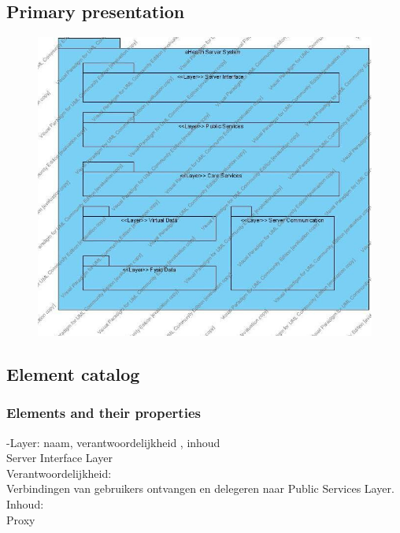 \documentclass[a4paper,10pt]{article}
\begin{document}
\subsection{Primary presentation}
\begin{center}
    \begin{figure}[h!]
      \includegraphics[width=\textwidth]{../images/LayeredView_Server.jpg}
    \end{figure}
  \end{center}

\subsection{Element catalog}

\subsubsection{Elements and their properties}

-Layer: naam, verantwoordelijkheid , inhoud\\

Server Interface Layer\\

Verantwoordelijkheid:\\
Verbindingen van gebruikers ontvangen en delegeren naar Public Services Layer.\\

Inhoud:\\
Proxy\\
\end{document}

